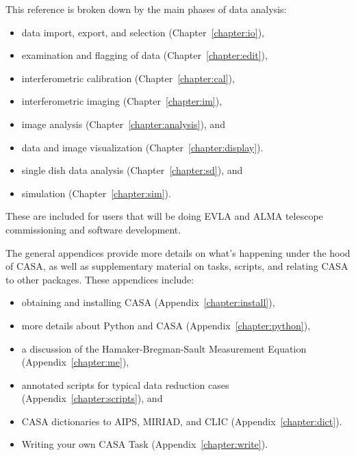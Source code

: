 This reference is broken down by the main phases of data analysis:
\begin{itemize}
   \item data import, export, and selection (Chapter~\ref{chapter:io}),

   \item examination and flagging of data (Chapter~\ref{chapter:edit}),

   \item interferometric calibration (Chapter~\ref{chapter:cal}),

   \item interferometric imaging (Chapter~\ref{chapter:im}),

   \item image analysis (Chapter~\ref{chapter:analysis}), and

   \item data and image visualization (Chapter~\ref{chapter:display}).

   \item single dish data analysis (Chapter~\ref{chapter:sd}), and

   \item simulation (Chapter~\ref{chapter:sim}).

\end{itemize}
These are included for users that will be doing EVLA and ALMA
telescope commissioning and software development.

The general appendices provide more details on what's happening
under the hood of CASA, as well as supplementary material on tasks,
scripts, and relating CASA to other packages.  These appendices
include:
\begin{itemize}
   \item obtaining and installing CASA 
         (Appendix~\ref{chapter:install}),

   \item more details about Python and CASA 
         (Appendix~\ref{chapter:python}),

   \item a discussion of the Hamaker-Bregman-Sault Measurement Equation
         (Appendix~\ref{chapter:me}),


   \item annotated scripts for typical data reduction cases 
         (Appendix~\ref{chapter:scripts}), and

   \item CASA dictionaries to AIPS, MIRIAD, and CLIC
         (Appendix~\ref{chapter:dict}).

   \item Writing your own CASA Task
         (Appendix~\ref{chapter:write}).
\end{itemize}

